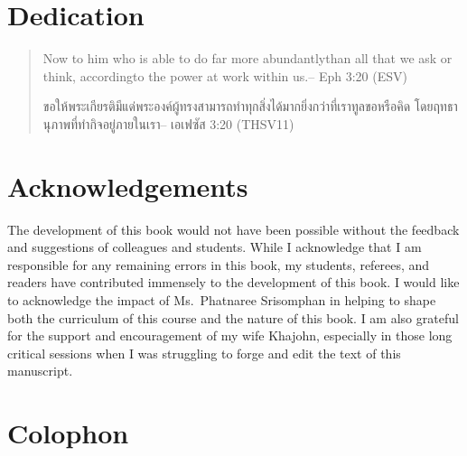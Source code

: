\documentclass[]{book}
\newcommand{\tai}{\fontspec[Scale=1.3]{[THSarabunNew.ttf:script=thai]}}
\begin{document}
\newpage

\hypertarget{dedication}{%
\section*{Dedication}\label{dedication}}

\begin{quote}
Now to him who is able to do far more abundantly\newline than all that we ask or think, according\newline to the power at work within us.\newline -- Eph 3:20 (ESV)\newline

\tai ขอให้พระเกียรติมีแด่พระองค์ผู้ทรงสามารถทำทุกสิ่งได้\newline มากยิ่งกว่าที่เราทูลขอหรือคิด โดยฤทธานุภาพ\newline ที่ทำกิจอยู่ภายในเรา\newline -- เอเฟซัส 3:20 (THSV11)\newline
\end{quote}

\newpage

\hypertarget{acknowledgements}{%
\section*{Acknowledgements}\label{acknowledgements}}

The development of this book would not have been possible without the feedback and suggestions of colleagues and students. While I acknowledge that I am responsible for any remaining errors in this book, my students, referees, and readers have contributed immensely to the development of this book. I would like to acknowledge the impact of Ms.~Phatnaree Srisomphan in helping to shape both the curriculum of this course and the nature of this book. I am also grateful for the support and encouragement of my wife Khajohn, especially in those long critical sessions when I was struggling to forge and edit the text of this manuscript.

\newpage

\hypertarget{colophon}{%
\section*{Colophon}\label{colophon}}
\end{document}
